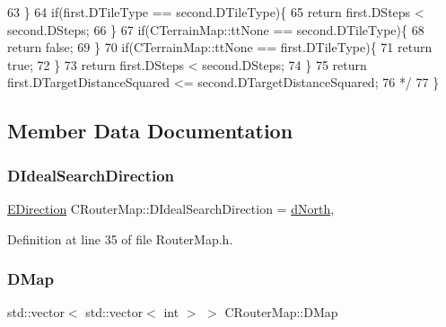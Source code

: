 \begin{DoxyCode}
63 \textcolor{comment}{        \}}
64 \textcolor{comment}{        if(first.DTileType == second.DTileType)\{}
65 \textcolor{comment}{            return first.DSteps < second.DSteps;}
66 \textcolor{comment}{        \}}
67 \textcolor{comment}{        if(CTerrainMap::ttNone == second.DTileType)\{}
68 \textcolor{comment}{            return false;   }
69 \textcolor{comment}{        \}}
70 \textcolor{comment}{        if(CTerrainMap::ttNone == first.DTileType)\{}
71 \textcolor{comment}{            return true;   }
72 \textcolor{comment}{        \}}
73 \textcolor{comment}{        return first.DSteps < second.DSteps;}
74 \textcolor{comment}{    \}}
75 \textcolor{comment}{    return first.DTargetDistanceSquared <= second.DTargetDistanceSquared;}
76 \textcolor{comment}{*/}
77 \}
\end{DoxyCode}


\subsection{Member Data Documentation}
\hypertarget{classCRouterMap_addf4151d25670daf5cb45058e978fde2}{}\label{classCRouterMap_addf4151d25670daf5cb45058e978fde2} 
\subsubsection{\texorpdfstring{D\+Ideal\+Search\+Direction}{DIdealSearchDirection}}
{\footnotesize\ttfamily \hyperlink{GameDataTypes_8h_acb2b033915f6659a71a38b5aa6e4eb42}{E\+Direction} C\+Router\+Map\+::\+D\+Ideal\+Search\+Direction = \hyperlink{GameDataTypes_8h_acb2b033915f6659a71a38b5aa6e4eb42a74d0139aee571cee88ff1393bbc6999e}{d\+North}\hspace{0.3cm}{\ttfamily [static]}, {\ttfamily [protected]}}



Definition at line 35 of file Router\+Map.\+h.

\hypertarget{classCRouterMap_a313fe70c998e9e3f22753d47075af1a6}{}\label{classCRouterMap_a313fe70c998e9e3f22753d47075af1a6} 
\subsubsection{\texorpdfstring{D\+Map}{DMap}}
{\footnotesize\ttfamily std\+::vector$<$ std\+::vector$<$ int $>$ $>$ C\+Router\+Map\+::\+D\+Map\hspace{0.3cm}{\ttfamily [protected]}}




